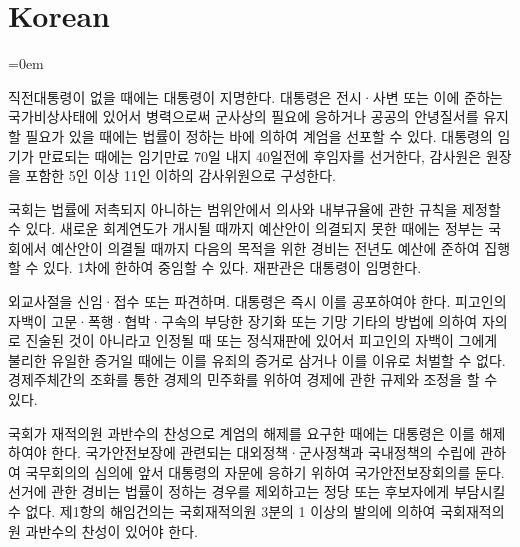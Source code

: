
\section{Korean}
\label{sec:korean}
\parindent=0em

\begin{CJK}{UTF8}{}

직전대통령이 없을 때에는 대통령이 지명한다. 대통령은 전시·사변 또는 이에 준하는
국가비상사태에 있어서 병력으로써 군사상의 필요에 응하거나 공공의 안녕질서를
유지할 필요가 있을 때에는 법률이 정하는 바에 의하여 계엄을 선포할 수 있다.
대통령의 임기가 만료되는 때에는 임기만료 70일 내지 40일전에 후임자를 선거한다,
감사원은 원장을 포함한 5인 이상 11인 이하의 감사위원으로 구성한다.

국회는 법률에 저촉되지 아니하는 범위안에서 의사와 내부규율에 관한 규칙을 제정할
수 있다. 새로운 회계연도가 개시될 때까지 예산안이 의결되지 못한 때에는 정부는
국회에서 예산안이 의결될 때까지 다음의 목적을 위한 경비는 전년도 예산에 준하여
집행할 수 있다. 1차에 한하여 중임할 수 있다. 재판관은 대통령이 임명한다.

외교사절을 신임·접수 또는 파견하며. 대통령은 즉시 이를 공포하여야 한다. 피고인의
자백이 고문·폭행·협박·구속의 부당한 장기화 또는 기망 기타의 방법에 의하여 자의로
진술된 것이 아니라고 인정될 때 또는 정식재판에 있어서 피고인의 자백이 그에게
불리한 유일한 증거일 때에는 이를 유죄의 증거로 삼거나 이를 이유로 처벌할 수
없다. 경제주체간의 조화를 통한 경제의 민주화를 위하여 경제에 관한 규제와 조정을
할 수 있다.

국회가 재적의원 과반수의 찬성으로 계엄의 해제를 요구한 때에는 대통령은 이를
해제하여야 한다. 국가안전보장에 관련되는 대외정책·군사정책과 국내정책의 수립에
관하여 국무회의의 심의에 앞서 대통령의 자문에 응하기 위하여 국가안전보장회의를
둔다. 선거에 관한 경비는 법률이 정하는 경우를 제외하고는 정당 또는 후보자에게
부담시킬 수 없다. 제1항의 해임건의는 국회재적의원 3분의 1 이상의 발의에 의하여
국회재적의원 과반수의 찬성이 있어야 한다.


\end{CJK}

